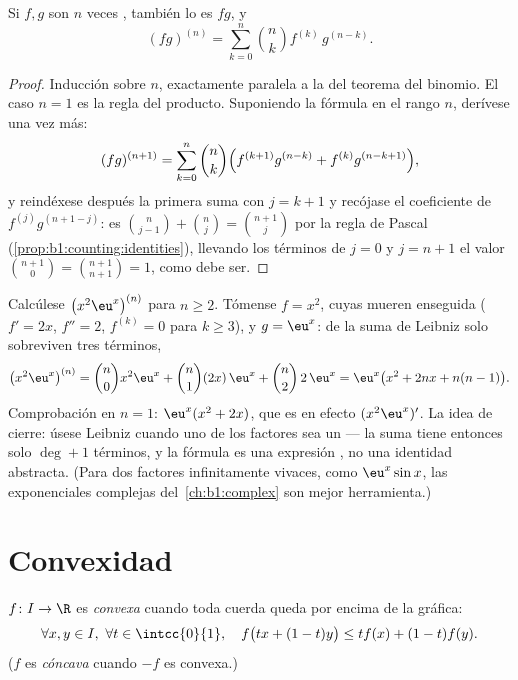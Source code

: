 \begin{theorem}\label{thm:b1:derivative:leibniz}
Si $f, g$ son $n$ veces , también lo es $fg$,
y
\[
(fg)^{(n)} = \sum_{k=0}^{n} \binom nk f^{(k)}\, g^{(n-k)} .
\]
\end{theorem}

\begin{proof}
Inducción sobre $n$, exactamente paralela a la del teorema del
binomio. El caso $n = 1$ es la regla del producto. Suponiendo la
fórmula en el rango $n$, derívese una vez más:
\[
(fg)^{(n+1)} = \sum_{k=0}^{n} \binom nk
\Bigl( f^{(k+1)} g^{(n-k)} + f^{(k)} g^{(n-k+1)} \Bigr),
\]
y reindéxese después la primera suma con $j = k + 1$ y recójase el
coeficiente de $f^{(j)} g^{(n+1-j)}$: es
$\binom{n}{j-1} + \binom nj = \binom{n+1}{j}$ por la regla de Pascal
(\cref{prop:b1:counting:identities}), llevando los términos de
 $j = 0$ y $j = n + 1$ el valor
$\binom{n+1}{0} = \binom{n+1}{n+1} = 1$, como debe ser.
\end{proof}

\begin{example}\label{ex:b1:derivative:leibnizaction}
Calcúlese $\bigl(x^2 \eu^x\bigr)^{(n)}$ para $n \geq 2$. Tómense
$f = x^2$, cuyas  mueren enseguida ($f' = 2x$, $f'' = 2$,
$f^{(k)} = 0$ para $k \geq 3$), y $g = \eu^x$: de la suma de Leibniz
solo sobreviven tres términos,
\[
\bigl(x^2\eu^x\bigr)^{(n)}
= \binom n0 x^2 \eu^x + \binom n1 (2x)\,\eu^x + \binom n2\,
2\,\eu^x
= \eu^x\bigl(x^2 + 2nx + n(n-1)\bigr).
\]
Comprobación en $n = 1$: $\eu^x(x^2 + 2x)$, que es en efecto
$(x^2\eu^x)'$. La idea de cierre: úsese Leibniz cuando uno de los
factores sea un  --- la suma tiene entonces solo $\deg + 1$
términos, y la fórmula es una expresión , no una identidad
abstracta. (Para dos factores infinitamente vivaces, como
$\eu^x\sin x$, las exponenciales complejas del~\cref{ch:b1:complex}
son mejor herramienta.)
\end{example}

\section{Convexidad}

\begin{definition}\label{def:b1:derivative:convex}
$f \colon I \to \R$ es \emph{convexa} cuando
toda cuerda queda por encima de la gráfica:
\[
\forall x, y \in I,\ \forall t \in \intcc{0}{1}, \quad
f\bigl(tx + (1-t)y\bigr) \leq t f(x) + (1-t) f(y).
\]
($f$ es \emph{cóncava} cuando $-f$ es convexa.)
\end{definition}

